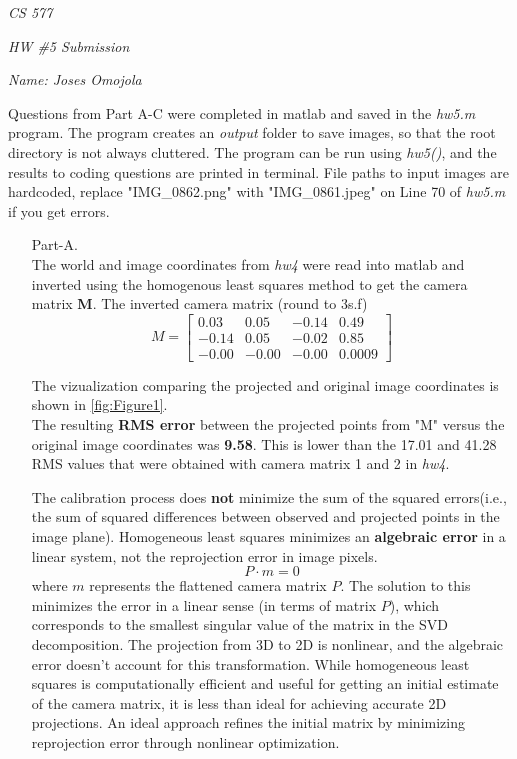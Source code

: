\documentclass[12pt]{report}
\begin{document}
\centerline{\it CS 577}
\centerline{\it HW \#5 Submission}
\centerline{\it Name: Joses Omojola}

Questions from Part A-C were completed in matlab and saved in the \emph{hw5.m} program. The program creates an \emph{output} folder to save images, 
so that the root directory is not always cluttered. The program can be run using \textit{hw5()}, and the results to coding questions are printed in 
terminal. File paths to input images are hardcoded, replace "IMG\_0862.png" with "IMG\_0861.jpeg" on Line 70 of \emph{hw5.m} if you get errors.

\begin{enumerate}

    \item[Part-A.]
    \ \\
    The world and image coordinates from \emph{hw4} were read into matlab and inverted using the homogenous least squares method to get the camera 
    matrix \textbf{M}. The inverted camera matrix (round to 3s.f)
    \[
    M = 
    \begin{bmatrix}
    0.03 & 0.05 & -0.14 & 0.49 \\
    -0.14 & 0.05 & -0.02 & 0.85 \\
    -0.00 & -0.00 & -0.00 & 0.0009
    \end{bmatrix}
    \]

    The vizualization comparing the projected and original image coordinates is shown in \autoref{fig:Figure1}.\\
    The resulting \textbf{RMS error} between the projected points from "M" versus the original image coordinates was \textbf{9.58}. This is lower than 
    the 17.01 and 41.28 RMS values that were obtained with camera matrix 1 and 2 in \emph{hw4}.  
    
    The calibration process does \textbf{not} minimize the sum of the squared errors(i.e., the sum of squared differences between observed and projected 
    points in the image plane). Homogeneous least squares minimizes an \textbf{algebraic error} in a linear system, not the reprojection error in image pixels. 
    $$P \cdot m = 0$$
    where $m$ represents the flattened camera matrix $P$. The solution to this minimizes the error in a linear sense (in terms of matrix $P$), which 
    corresponds to the smallest singular value of the matrix in the SVD decomposition. The projection from 3D to 2D is nonlinear, and the algebraic error 
    doesn't account for this transformation. While homogeneous least squares is computationally efficient and useful for getting an initial estimate of 
    the camera matrix, it is less than ideal for achieving accurate 2D projections. An ideal approach refines the initial matrix by minimizing reprojection 
    error through nonlinear optimization.


\end{enumerate}
\end{document}
